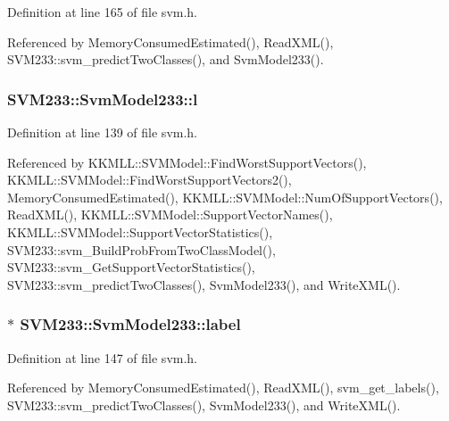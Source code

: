 Definition at line 165 of file svm.\+h.



Referenced by Memory\+Consumed\+Estimated(), Read\+X\+M\+L(), S\+V\+M233\+::svm\+\_\+predict\+Two\+Classes(), and Svm\+Model233().

\subsubsection[{\texorpdfstring{l}{l}}]{ S\+V\+M233\+::\+Svm\+Model233\+::l}\hypertarget{struct_s_v_m233_1_1_svm_model233_ae37947940a05ecebb1352b6f365b4050}{}\label{struct_s_v_m233_1_1_svm_model233_ae37947940a05ecebb1352b6f365b4050}


Definition at line 139 of file svm.\+h.



Referenced by K\+K\+M\+L\+L\+::\+S\+V\+M\+Model\+::\+Find\+Worst\+Support\+Vectors(), K\+K\+M\+L\+L\+::\+S\+V\+M\+Model\+::\+Find\+Worst\+Support\+Vectors2(), Memory\+Consumed\+Estimated(), K\+K\+M\+L\+L\+::\+S\+V\+M\+Model\+::\+Num\+Of\+Support\+Vectors(), Read\+X\+M\+L(), K\+K\+M\+L\+L\+::\+S\+V\+M\+Model\+::\+Support\+Vector\+Names(), K\+K\+M\+L\+L\+::\+S\+V\+M\+Model\+::\+Support\+Vector\+Statistics(), S\+V\+M233\+::svm\+\_\+\+Build\+Prob\+From\+Two\+Class\+Model(), S\+V\+M233\+::svm\+\_\+\+Get\+Support\+Vector\+Statistics(), S\+V\+M233\+::svm\+\_\+predict\+Two\+Classes(), Svm\+Model233(), and Write\+X\+M\+L().

\subsubsection[{\texorpdfstring{label}{label}}]{$\ast$ S\+V\+M233\+::\+Svm\+Model233\+::label}\hypertarget{struct_s_v_m233_1_1_svm_model233_a36d0c9e4a7019a0de64fc8661cc10bf3}{}\label{struct_s_v_m233_1_1_svm_model233_a36d0c9e4a7019a0de64fc8661cc10bf3}


Definition at line 147 of file svm.\+h.



Referenced by Memory\+Consumed\+Estimated(), Read\+X\+M\+L(), svm\+\_\+get\+\_\+labels(), S\+V\+M233\+::svm\+\_\+predict\+Two\+Classes(), Svm\+Model233(), and Write\+X\+M\+L().


